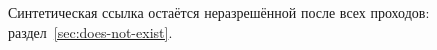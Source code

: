 \documentclass{article}
\begin{document}
Синтетическая ссылка остаётся неразрешённой после всех проходов:
раздел~\ref{sec:does-not-exist}.
\end{document}
